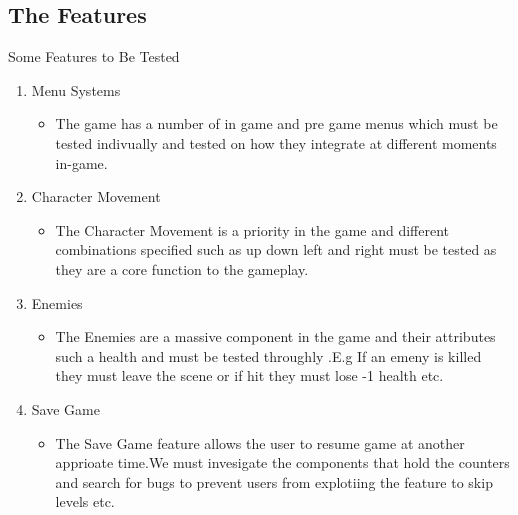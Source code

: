 

\subsection{The Features}

\centerline{Some Features to Be Tested}

\begin{enumerate}
   \item Menu Systems 
   \begin{itemize}
     \item The game has a number of in game and pre game menus which must be tested indivually and tested on how they integrate at different moments in-game.
   \end{itemize}
  
  \item Character Movement
   \begin{itemize}
     \item The Character Movement is a priority in the game and different combinations specified such as up down left and right must be tested as they are a core function to the gameplay.

   \end{itemize}

     \item Enemies 
   \begin{itemize}
     \item The Enemies are a massive component in the game and their attributes such a health and must be tested throughly .E.g If an emeny is killed they must leave the scene or if hit they must lose -1 health etc.
   \end{itemize}



 \item Save Game
   \begin{itemize}
 	\item 
 	The Save Game feature allows the user to resume game at another apprioate time.We must invesigate the components that hold the counters and search for bugs to prevent users from explotiing the feature to skip levels etc.
 	 \end{itemize}
 	 \end{enumerate}

